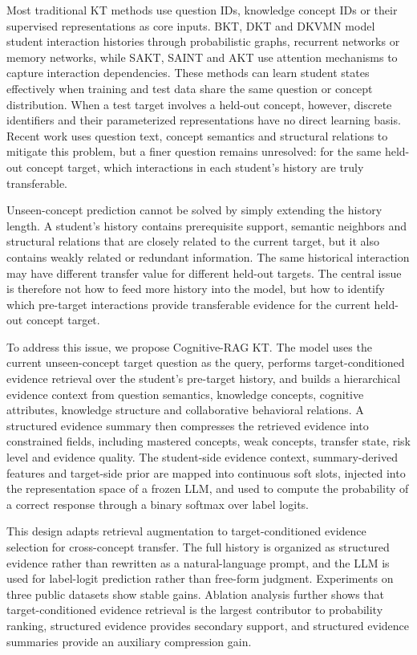 \documentclass[a4paper,12pt]{article}
\numberwithin{table}{section}
\begin{document}
Most traditional KT methods use question IDs, knowledge concept IDs or their supervised representations as core inputs. BKT, DKT and DKVMN model student interaction histories through probabilistic graphs, recurrent networks or memory networks, while SAKT, SAINT and AKT use attention mechanisms to capture interaction dependencies\citep{corbett1995knowledge,piech2015deep,zhang2017dynamic,pandey2019sakt,choi2020saint,ghosh2020akt}. These methods can learn student states effectively when training and test data share the same question or concept distribution. When a test target involves a held-out concept, however, discrete identifiers and their parameterized representations have no direct learning basis. Recent work uses question text, concept semantics and structural relations to mitigate this problem\citep{fu2024sinkt}, but a finer question remains unresolved: for the same held-out concept target, which interactions in each student's history are truly transferable.

Unseen-concept prediction cannot be solved by simply extending the history length. A student's history contains prerequisite support, semantic neighbors and structural relations that are closely related to the current target, but it also contains weakly related or redundant information. The same historical interaction may have different transfer value for different held-out targets. The central issue is therefore not how to feed more history into the model, but how to identify which pre-target interactions provide transferable evidence for the current held-out concept target.

To address this issue, we propose Cognitive-RAG KT. The model uses the current unseen-concept target question as the query, performs target-conditioned evidence retrieval over the student's pre-target history, and builds a hierarchical evidence context from question semantics, knowledge concepts, cognitive attributes, knowledge structure and collaborative behavioral relations. A structured evidence summary then compresses the retrieved evidence into constrained fields, including mastered concepts, weak concepts, transfer state, risk level and evidence quality. The student-side evidence context, summary-derived features and target-side prior are mapped into continuous soft slots, injected into the representation space of a frozen LLM, and used to compute the probability of a correct response through a binary softmax over label logits.

This design adapts retrieval augmentation to target-conditioned evidence selection for cross-concept transfer. The full history is organized as structured evidence rather than rewritten as a natural-language prompt, and the LLM is used for label-logit prediction rather than free-form judgment. Experiments on three public datasets show stable gains. Ablation analysis further shows that target-conditioned evidence retrieval is the largest contributor to probability ranking, structured evidence provides secondary support, and structured evidence summaries provide an auxiliary compression gain.
\end{document}
